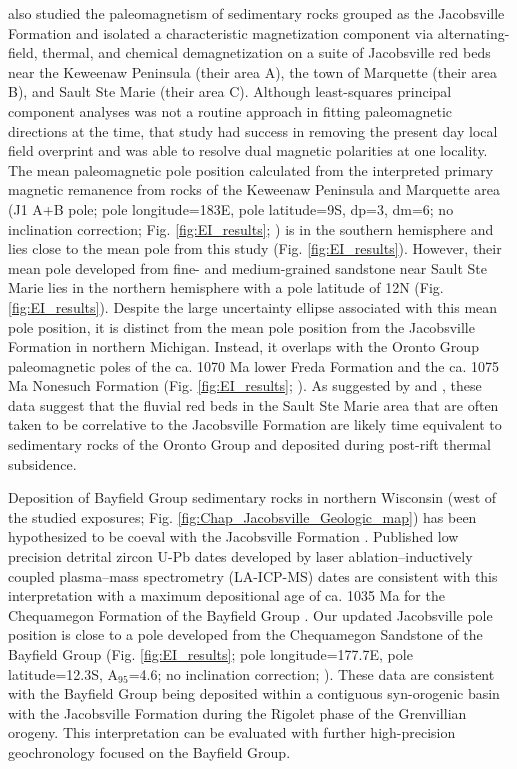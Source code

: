 \cite{Roy1978a} also studied the paleomagnetism of sedimentary rocks grouped as the Jacobsville Formation and isolated a characteristic magnetization component via alternating-field, thermal, and chemical demagnetization on a suite of Jacobsville red beds near the Keweenaw Peninsula (their area A), the town of Marquette (their area B), and Sault Ste Marie (their area C). Although least-squares principal component analyses was not a routine approach in fitting paleomagnetic directions at the time, that study had success in removing the present day local field overprint and was able to resolve dual magnetic polarities at one locality. The mean paleomagnetic pole position calculated from the interpreted primary magnetic remanence from rocks of the Keweenaw Peninsula and Marquette area (J1 A+B pole; pole longitude=183\textdegree E, pole latitude=9\textdegree S, dp=3\textdegree, dm=6\textdegree; no inclination correction; Fig. \ref{fig:EI_results}; \citealp{Roy1978a}) is in the southern hemisphere and lies close to the mean pole from this study (Fig. \ref{fig:EI_results}). However, their mean pole developed from fine- and medium-grained sandstone near Sault Ste Marie lies in the northern hemisphere with a pole latitude of 12\textdegree N (Fig. \ref{fig:EI_results}). Despite the large uncertainty ellipse associated with this mean pole position, it is distinct from the mean pole position from the Jacobsville Formation in northern Michigan. Instead, it overlaps with the Oronto Group paleomagnetic poles of the ca. 1070 Ma lower Freda Formation and the ca. 1075 Ma Nonesuch Formation (Fig. \ref{fig:EI_results}; \citealp{Henry1977a, Slotznick2023a}). As suggested by \cite{Dubois1962a} and \cite{Roy1978a}, these data suggest that the fluvial red beds in the Sault Ste Marie area that are often taken to be correlative to the Jacobsville Formation \cite[e.g.][]{Malone2020a} are likely time equivalent to sedimentary rocks of the Oronto Group and deposited during post-rift thermal subsidence. 

Deposition of Bayfield Group sedimentary rocks in northern Wisconsin (west of the studied exposures; Fig. \ref{fig:Chap_Jacobsville_Geologic_map}) has been hypothesized to be coeval with the Jacobsville Formation \citep{Hamblin1958a, Kalliokoski1982a, Malone2016a}. Published low precision detrital zircon U-Pb dates developed by laser ablation–inductively coupled plasma–mass spectrometry (LA-ICP-MS) dates are consistent with this interpretation with a maximum depositional age of ca. 1035 Ma for the Chequamegon Formation of the Bayfield Group \citep{Craddock2013a}. Our updated Jacobsville pole position is close to a pole developed from the Chequamegon Sandstone of the Bayfield Group (Fig. \ref{fig:EI_results}; pole longitude=177.7\textdegree E, pole latitude=12.3\textdegree S, A$_95$=4.6\textdegree; no inclination correction; \citealp{McCabe1983a}). These data are consistent with the Bayfield Group being deposited within a contiguous syn-orogenic basin with the Jacobsville Formation during the Rigolet phase of the Grenvillian orogeny. This interpretation can be evaluated with further high-precision geochronology focused on the Bayfield Group. 

